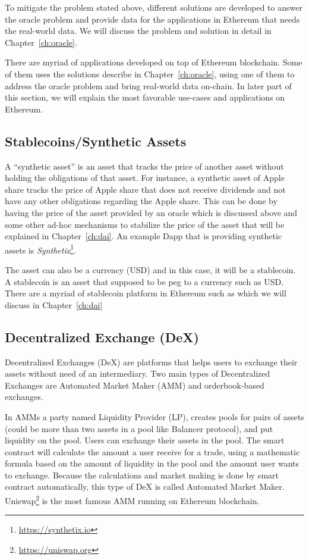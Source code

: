 To mitigate the problem stated above, different solutions are developed to answer the oracle problem and provide data for the applications in Ethereum that needs the real-world data. We will discuss the problem and solution in detail in Chapter~\ref{ch:oracle}.

There are myriad of applications developed on top of Ethereum blockchain. Some of them uses the solutions describe in  Chapter~\ref{ch:oracle}, using one of them to address the oracle problem and bring real-world data on-chain. In later part of this section, we will explain the most favorable use-cases and applications on Ethereum.

\subsection{Stablecoins/Synthetic Assets}

A ``synthetic asset'' is an asset that tracks the price of another asset without holding the obligations of that asset. For instance, a synthetic asset of Apple share tracks the price of Apple share that does not receive dividends and not have any other obligations regarding the Apple share. This can be done by having the price of the asset provided by an oracle which is discussed above and some other ad-hoc mechanisms to stabilize the price of the asset that will be explained in Chapter~\ref{ch:dai}. An example Dapp that is providing synthetic assets is \textit{Synthetix}\footnote{\url{https://synthetix.io}}.

The asset can also be a currency (\eg USD) and in this case, it will be a stablecoin. A stablecoin is an asset that supposed to be peg to a currency such as USD. There are a myriad of stablecoin platform in Ethereum such as \dai which we will discuss in Chapter~\ref{ch:dai}

\subsection{Decentralized Exchange (DeX)}
Decentralized Exchanges (DeX) are platforms that helps users to exchange their assets without need of an intermediary. Two main types of Decentralized Exchanges are Automated Market Maker (AMM) and orderbook-based exchanges. 

In AMMs a party named Liquidity Provider (LP), creates pools for pairs of assets (could be more than two assets in a pool like Balancer protocol), and put liquidity on the pool. Users can exchange their assets in the pool. The smart contract will calculate the amount a user receive for a trade, using a mathematic formula based on the amount of liquidity in the pool and the amount user wants to exchange. Because the calculations and market making is done by smart contract automatically, this type of DeX is called Automated Market Maker. Uniswap\footnote{\url{https://uniswap.org}} is the most famous AMM running on Ethereum blockchain.

